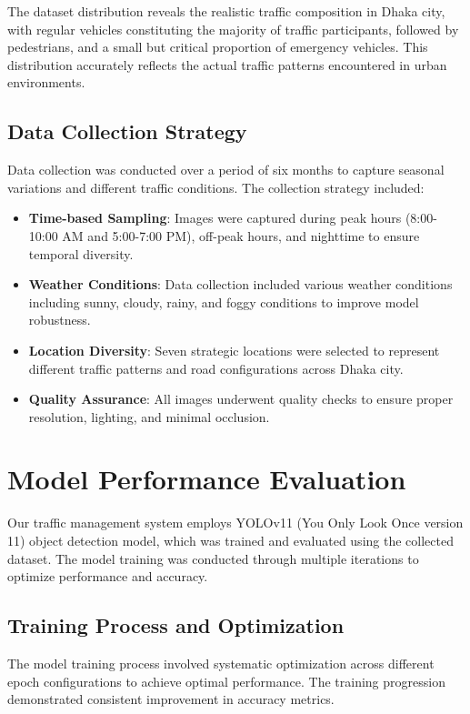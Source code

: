 The dataset distribution reveals the realistic traffic composition in Dhaka city, with regular vehicles constituting the majority of traffic participants, followed by pedestrians, and a small but critical proportion of emergency vehicles. This distribution accurately reflects the actual traffic patterns encountered in urban environments.

\subsection{Data Collection Strategy}
Data collection was conducted over a period of six months to capture seasonal variations and different traffic conditions. The collection strategy included:

\begin{itemize}
    \item \textbf{Time-based Sampling}: Images were captured during peak hours (8:00-10:00 AM and 5:00-7:00 PM), off-peak hours, and nighttime to ensure temporal diversity.
    \item \textbf{Weather Conditions}: Data collection included various weather conditions including sunny, cloudy, rainy, and foggy conditions to improve model robustness.
    \item \textbf{Location Diversity}: Seven strategic locations were selected to represent different traffic patterns and road configurations across Dhaka city.
    \item \textbf{Quality Assurance}: All images underwent quality checks to ensure proper resolution, lighting, and minimal occlusion.
\end{itemize}

\section{Model Performance Evaluation}
\label{sec:model_performance}

Our traffic management system employs YOLOv11 (You Only Look Once version 11) object detection model, which was trained and evaluated using the collected dataset. The model training was conducted through multiple iterations to optimize performance and accuracy.

\subsection{Training Process and Optimization}
The model training process involved systematic optimization across different epoch configurations to achieve optimal performance. The training progression demonstrated consistent improvement in accuracy metrics.

